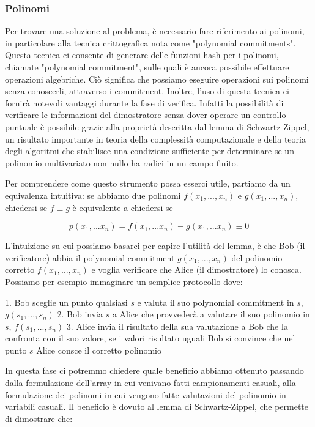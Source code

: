 \subsubsection{Polinomi}

Per trovare una soluzione al problema, è necessario fare riferimento ai polinomi, in particolare alla tecnica
crittografica nota come "polynomial commitments". Questa tecnica ci consente di generare delle funzioni hash per i
polinomi, chiamate "polynomial commitment", sulle quali è ancora possibile effettuare operazioni algebriche. Ciò
significa che possiamo eseguire operazioni sui polinomi senza conoscerli, attraverso i commitment. Inoltre, l'uso di
questa tecnica ci fornirà notevoli vantaggi durante la fase di verifica. Infatti la possibilità di verificare le
informazioni del dimostratore senza dover operare un controllo puntuale è possibile grazie alla proprietà descritta dal
lemma di Schwartz-Zippel, un risultato importante in teoria della complessità computazionale e della teoria degli
algoritmi che stabilisce una condizione sufficiente per determinare se un polinomio multivariato non nullo ha radici in
un campo finito.

Per comprendere come questo strumento possa esserci utile, partiamo da un equivalenza intuitiva: se abbiamo due polinomi
$f(x_1,...,x_n)$ e $g(x_1,...,x_n)$, chiedersi se $f \equiv g$ è equivalente a chiedersi se 

\begin{equation}
p(x_1,...x_n) = f(x_1,...x_n)-g(x_1,...x_n) \equiv 0
\end{equation}

L'intuizione su cui possiamo basarci per capire l’utilità del lemma, è che Bob (il verificatore) abbia il polynomial
commitment  $g(x_1,...,x_n)$ del polinomio corretto $f(x_1,...,x_n)$ e voglia verificare che Alice (il dimostratore) lo
conosca. Possiamo per esempio immaginare un semplice protocollo dove:

1. Bob sceglie un punto qualsiasi $s$ e valuta il suo polynomial commitment in $s$, $g(s_1,...,s_n)$ 2. Bob invia $s$ a
Alice che provvederà a valutare il suo polinomio in $s$, $f(s_1,...,s_n)$ 3. Alice invia il risultato della sua
valutazione a Bob che la confronta con il suo valore, se i valori risultato uguali Bob si convince che nel punto $s$
Alice consce il corretto polinomio

In questa fase ci potremmo chiedere quale beneficio abbiamo ottenuto passando dalla formulazione dell'array in cui
venivano fatti campionamenti casuali, alla formulazione dei polinomi in cui vengono fatte valutazioni del polinomio in
variabili casuali. Il beneficio è dovuto al lemma di Schwartz-Zippel, che permette di dimostrare che:

